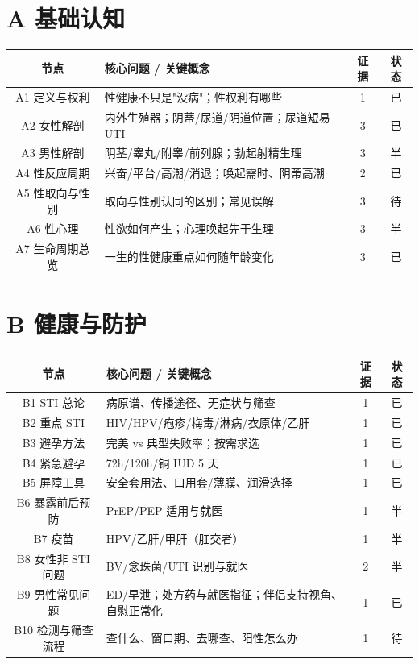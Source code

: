 \documentclass[12pt,UTF8,openany]{ctexbook}
\begin{document}
\section{A 基础认知}

\begin{tabularx}{\linewidth}{C X c c}
\toprule
\textbf{节点} & \textbf{核心问题 / 关键概念} & \textbf{证据} & \textbf{状态} \\
\midrule
A1 定义与权利 & 性健康不只是"没病"；性权利有哪些 & 1 & 已 \\
A2 女性解剖 & 内外生殖器；阴蒂/尿道/阴道位置；尿道短易 UTI & 3 & 已 \\
A3 男性解剖 & 阴茎/睾丸/附睾/前列腺；勃起射精生理 & 3 & 半 \\
A4 性反应周期 & 兴奋/平台/高潮/消退；唤起需时、阴蒂高潮 & 2 & 已 \\
A5 性取向与性别 & 取向与性别认同的区别；常见误解 & 3 & 待 \\
A6 性心理 & 性欲如何产生；心理唤起先于生理 & 3 & 半 \\
A7 生命周期总览 & 一生的性健康重点如何随年龄变化 & 3 & 已 \\
\bottomrule
\end{tabularx}

\section{B 健康与防护}

\begin{tabularx}{\linewidth}{C X c c}
\toprule
\textbf{节点} & \textbf{核心问题 / 关键概念} & \textbf{证据} & \textbf{状态} \\
\midrule
B1 STI 总论 & 病原谱、传播途径、无症状与筛查 & 1 & 已 \\
B2 重点 STI & HIV/HPV/疱疹/梅毒/淋病/衣原体/乙肝 & 1 & 已 \\
B3 避孕方法 & 完美 vs 典型失败率；按需求选 & 1 & 已 \\
B4 紧急避孕 & 72h/120h/铜 IUD 5 天 & 1 & 已 \\
B5 屏障工具 & 安全套用法、口用套/薄膜、润滑选择 & 1 & 已 \\
B6 暴露前后预防 & PrEP/PEP 适用与就医 & 1 & 半 \\
B7 疫苗 & HPV/乙肝/甲肝（肛交者） & 1 & 半 \\
B8 女性非 STI 问题 & BV/念珠菌/UTI 识别与就医 & 2 & 半 \\
B9 男性常见问题 & ED/早泄；处方药与就医指征；伴侣支持视角、自慰正常化 & 1 & 已 \\
B10 检测与筛查流程 & 查什么、窗口期、去哪查、阳性怎么办 & 1 & 待 \\
\bottomrule
\end{tabularx}
\end{document}
